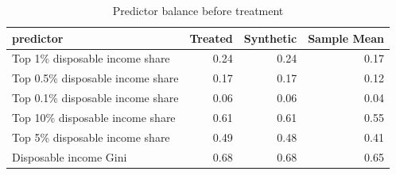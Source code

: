 \begin{table}[ht]
\centering
\begin{tabular}{lrrr}
  \hline
predictor & Treated & Synthetic & Sample Mean \\ 
  \hline
Top 1\% disposable income share & 0.24 & 0.24 & 0.17 \\ 
  Top 0.5\% disposable income share & 0.17 & 0.17 & 0.12 \\ 
  Top 0.1\% disposable income share & 0.06 & 0.06 & 0.04 \\ 
  Top 10\% disposable income share & 0.61 & 0.61 & 0.55 \\ 
  Top 5\% disposable income share & 0.49 & 0.48 & 0.41 \\ 
  Disposable income Gini & 0.68 & 0.68 & 0.65 \\ 
   \hline
\end{tabular}
\caption{Predictor balance before treatment} 
\label{tab:balance}
\end{table}
